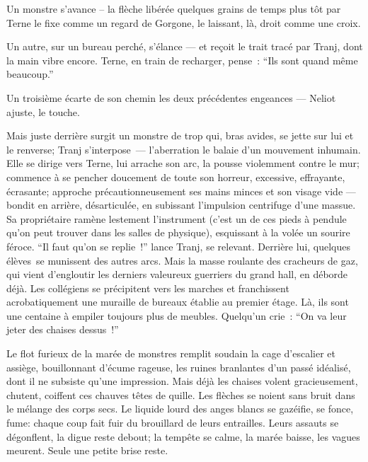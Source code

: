 \documentclass{parch}
\begin{document}
	
	\begin{multicols}{3}
		\begin{spacing}{1}
		\begin{gridenv}
		\end{gridenv}
		\vspace*{1.5mm}
		
		Un monstre s'avance – la flèche libérée quelques grains de temps plus tôt par Terne le fixe comme un regard de Gorgone, le laissant, là, droit comme une croix.
		
		
		Un autre, sur un bureau perché, s'élance --- et reçoit le trait tracé par Tranj, dont la main vibre encore. Terne, en train de recharger, pense : \enquote{Ils sont quand même beaucoup.}
		
		Un troisième écarte de son chemin les deux précédentes engeances --- Neliot ajuste, le touche.
		
		Mais juste derrière surgit un monstre de trop qui, bras avides, se jette sur lui et le renverse; Tranj s'interpose --- l'aberration le balaie d'un mouvement inhumain. Elle se dirige vers Terne, lui arrache son arc, la pousse violemment contre le mur; commence à se pencher doucement de toute son horreur, excessive, effrayante, écrasante; approche précautionneusement ses mains minces et son visage vide --- bondit en arrière, désarticulée, en subissant l'impulsion centrifuge d'une massue. Sa propriétaire ramène lestement l'instrument (c'est un de ces pieds à pendule qu'on peut trouver dans les salles de physique), esquissant à la volée un sourire féroce. \enquote{Il faut qu'on se replie !} lance Tranj, se relevant. Derrière lui, quelques élèves se munissent des autres arcs. Mais la masse roulante des cracheurs de gaz, qui vient d'engloutir les derniers valeureux guerriers du grand hall, en déborde déjà. Les collégiens se précipitent vers les marches et franchissent acrobatiquement une muraille de bureaux établie au premier étage. Là, ils sont une centaine à empiler toujours plus de meubles. Quelqu'un crie : \enquote{On va leur jeter des chaises dessus !}
		
		Le flot furieux de la marée de monstres remplit soudain la cage d'escalier et assiège, bouillonnant d'écume rageuse, les ruines branlantes d'un passé idéalisé, dont il ne subsiste qu'une impression. Mais déjà les chaises volent gracieusement, chutent, coiffent ces chauves têtes de quille. Les flèches se noient sans bruit dans le mélange des corps secs. Le liquide lourd des anges blancs se gazéifie, se fonce, fume: chaque coup fait fuir du brouillard de leurs entrailles. Leurs assauts se dégonflent, la digue reste debout; la tempête se calme, la marée baisse, les vagues meurent. Seule une petite brise reste.
		

\end{spacing}
\end{multicols}
\end{document}
